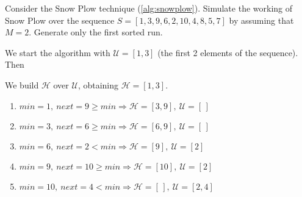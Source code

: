 \exercise

Consider the Snow Plow technique (\autoref{alg:snowplow}). Simulate the working
of Snow Plow over the sequence $S = [1, 3, 9, 6, 2, 10, 4, 8, 5, 7]$ by assuming
that $M = 2$. Generate only the first sorted run.

\solution

We start the algorithm with $\mathcal{U} = [1, 3]$ (the first 2 elements of the
sequence). Then
%
\begin{description}[labelindent=0.5cm]

  \item[Run 1.] We build $\mathcal{H}$ over $\mathcal{U}$, obtaining
  $\mathcal{H} = [1, 3]$.
  \begin{enumerate}

    \item $min = 1,\ next = 9 \ge min \Longrightarrow \mathcal{H} = [3, 9],\
    \mathcal{U} = [\,]$

    \item $min = 3,\ next = 6 \ge min \Longrightarrow \mathcal{H} = [6, 9],\
    \mathcal{U} = [\,]$

    \item $min = 6,\ next = 2 < min \Longrightarrow \mathcal{H} = [9],\
    \mathcal{U} = [2]$

    \item $min = 9,\ next = 10 \ge min \Longrightarrow \mathcal{H} = [10],\
    \mathcal{U} = [2]$

    \item $min = 10,\ next = 4 < min \Longrightarrow \mathcal{H} = [\,],\
    \mathcal{U} = [2, 4]$

  \end{enumerate}

\end{description}

